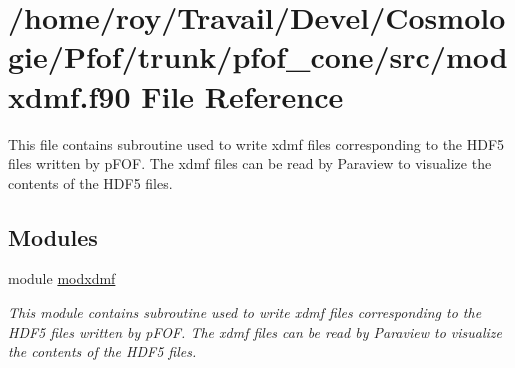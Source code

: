 \hypertarget{pfof__cone_2src_2modxdmf_8f90}{}\section{/home/roy/\+Travail/\+Devel/\+Cosmologie/\+Pfof/trunk/pfof\+\_\+cone/src/modxdmf.f90 File Reference}
\label{pfof__cone_2src_2modxdmf_8f90}


This file contains subroutine used to write xdmf files corresponding to the H\+D\+F5 files written by p\+F\+OF. The xdmf files can be read by Paraview to visualize the contents of the H\+D\+F5 files.  


\subsection*{Modules}
\begin{DoxyCompactItemize}
\item 
module \hyperlink{namespacemodxdmf}{modxdmf}
\begin{DoxyCompactList}\small\item\em This module contains subroutine used to write xdmf files corresponding to the H\+D\+F5 files written by p\+F\+OF. The xdmf files can be read by Paraview to visualize the contents of the H\+D\+F5 files. \end{DoxyCompactList}\end{DoxyCompactItemize}
